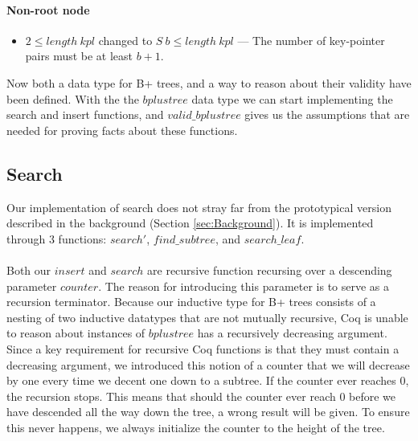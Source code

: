 \paragraph{Non-root node}
\begin{itemize}
\item $2 \leq length\ kpl$ changed to $S\ b \leq length\ kpl$ --- The number of key-pointer pairs must be at least $b+1$.
\end{itemize}

Now both a data type for B+ trees, and a way to reason about their validity have been defined. With the the $bplustree$ data type we can start implementing the search and insert functions, and $valid\_bplustree$ gives us the assumptions that are needed for proving facts about these functions.

\subsection{Search}
\label{subsec:search}
Our implementation of search does not stray far from the prototypical version described in the background (Section \ref{sec:Background}). It is implemented through 3 functions: $search'$, $find\_subtree$, and $search\_leaf$. 

\paragraph{}
Both our $insert$ and $search$ are recursive function recursing over a descending parameter $counter$. The reason for introducing this parameter is to serve as a recursion terminator. Because our inductive type for B+ trees consists of a nesting of two inductive datatypes that are not mutually recursive, Coq is unable to reason about instances of $bplustree$ has a recursively decreasing argument. Since a key requirement for recursive Coq functions is that they must contain a decreasing argument, we introduced this notion of a counter that we will decrease by one every time we decent one down to a subtree. If the counter ever reaches $0$, the recursion stops. This means that should the counter ever reach $0$ before we have descended all the way down the tree, a wrong result will be given. To ensure this never happens, we always initialize the counter to the height of the tree.

